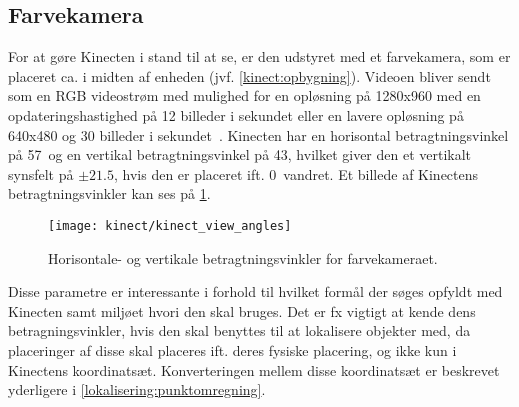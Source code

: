 \subsection{Farvekamera}\label{kinect:farvekamera}
For at gøre Kinecten i stand til at se, er den udstyret med et farvekamera, som er placeret ca. i midten af enheden (jvf. \cref{kinect:opbygning}).
Videoen bliver sendt som en RGB videostrøm med mulighed for en opløsning på 1280x960 med en opdateringshastighed på 12 billeder i sekundet eller en lavere opløsning på 640x480 og 30 billeder i sekundet~\cite{kinectForWindowsFeatures}.
Kinecten har en horisontal betragtningsvinkel på 57\degree~og en vertikal betragtningsvinkel på 43\degree, hvilket giver den et vertikalt synsfelt på $\pm 21.5$\degree, hvis den er placeret ift. 0\degree~vandret.
Et billede af Kinectens betragtningsvinkler kan ses på \cref{kinect:vinkler}.

\begin{figure}
\centering
\texttt{[image: kinect/kinect\_view\_angles]}
\caption{Horisontale- og vertikale betragtningsvinkler for farvekameraet.}
\label{kinect:vinkler}
\end{figure}

Disse parametre er interessante i forhold til hvilket formål der søges opfyldt med Kinecten samt miljøet hvori den skal bruges. 
Det er fx vigtigt at kende dens betragningsvinkler, hvis den skal benyttes til at lokalisere objekter med, da placeringer af disse skal placeres ift. deres fysiske placering, og ikke kun i Kinectens koordinatsæt.
Konverteringen mellem disse koordinatsæt er beskrevet yderligere i \cref{lokalisering:punktomregning}.

